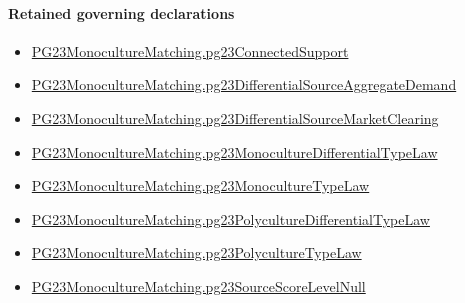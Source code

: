 \documentclass[10pt]{article}
\begin{document}
\paragraph{Retained governing declarations}
\begin{itemize}\raggedright
\item \hyperlink{paper-prerequisite-3ea91dd17eec5e64}{PG23\allowbreak{}Monoculture\allowbreak{}Matching.\allowbreak{}pg23\allowbreak{}Connected\allowbreak{}Support}
\item \hyperlink{paper-prerequisite-8862e3e199188580}{PG23\allowbreak{}Monoculture\allowbreak{}Matching.\allowbreak{}pg23\allowbreak{}Differential\allowbreak{}Source\allowbreak{}Aggregate\allowbreak{}Demand}
\item \hyperlink{paper-prerequisite-b0301ef9ff59e71b}{PG23\allowbreak{}Monoculture\allowbreak{}Matching.\allowbreak{}pg23\allowbreak{}Differential\allowbreak{}Source\allowbreak{}Market\allowbreak{}Clearing}
\item \hyperlink{paper-prerequisite-b89cd6c5c3c5cca3}{PG23\allowbreak{}Monoculture\allowbreak{}Matching.\allowbreak{}pg23\allowbreak{}Monoculture\allowbreak{}Differential\allowbreak{}Type\allowbreak{}Law}
\item \hyperlink{paper-prerequisite-e248b62a880a6917}{PG23\allowbreak{}Monoculture\allowbreak{}Matching.\allowbreak{}pg23\allowbreak{}Monoculture\allowbreak{}Type\allowbreak{}Law}
\item \hyperlink{paper-prerequisite-77e418f4c944c6e4}{PG23\allowbreak{}Monoculture\allowbreak{}Matching.\allowbreak{}pg23\allowbreak{}Polyculture\allowbreak{}Differential\allowbreak{}Type\allowbreak{}Law}
\item \hyperlink{paper-prerequisite-57a6e28ae64a74da}{PG23\allowbreak{}Monoculture\allowbreak{}Matching.\allowbreak{}pg23\allowbreak{}Polyculture\allowbreak{}Type\allowbreak{}Law}
\item \hyperlink{paper-prerequisite-26aa95cb7c69a47b}{PG23\allowbreak{}Monoculture\allowbreak{}Matching.\allowbreak{}pg23\allowbreak{}Source\allowbreak{}Score\allowbreak{}Level\allowbreak{}Null}
\end{itemize}
\end{document}

